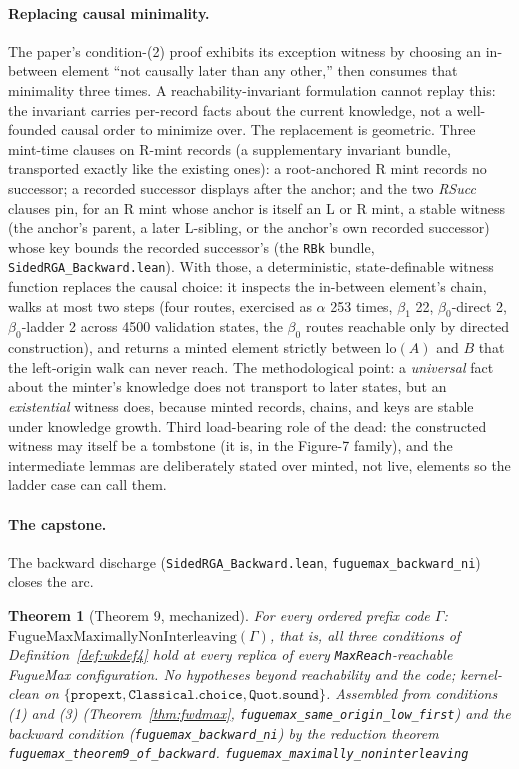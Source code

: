 \documentclass[11pt]{article}
\newtheorem{theorem}{Theorem}[section]
\newcommand{\lean}[1]{\texttt{#1}}
\newcommand{\code}[1]{\texttt{#1}}
\begin{document}
\paragraph{Replacing causal minimality.} The paper's condition-(2)
proof exhibits its exception witness by choosing an in-between element
``not causally later than any other,'' then consumes that minimality
three times. A reachability-invariant formulation cannot replay this:
the invariant carries per-record facts about the current knowledge, not
a well-founded causal order to minimize over. The replacement is
geometric. Three mint-time clauses on R-mint records (a supplementary
invariant bundle, transported exactly like the existing ones): a
root-anchored R mint records no successor; a recorded successor
displays after the anchor; and the two \emph{RSucc} clauses pin, for an
R mint whose anchor is itself an L or R mint, a stable witness (the
anchor's parent, a later L-sibling, or the anchor's own recorded
successor) whose key bounds the recorded successor's (the \lean{RBk}
bundle, \code{SidedRGA\_Backward.lean}). With those, a
deterministic, state-definable witness function replaces the causal
choice: it inspects the in-between element's chain, walks at most two
steps (four routes, exercised as $\alpha$ 253 times, $\beta_1$ 22,
$\beta_0$-direct 2, $\beta_0$-ladder 2 across 4500 validation states,
the $\beta_0$ routes reachable only by directed construction), and
returns a minted element strictly between $\mathrm{lo}(A)$ and $B$ that
the left-origin walk can never reach. The methodological point: a
\emph{universal} fact about the minter's knowledge does not transport
to later states, but an \emph{existential} witness does, because minted
records, chains, and keys are stable under knowledge growth. Third
load-bearing role of the dead: the constructed witness may itself be a
tombstone (it is, in the Figure-7 family), and the intermediate lemmas
are deliberately stated over minted, not live, elements so the ladder
case can call them.

\paragraph{The capstone.} The backward discharge
(\code{SidedRGA\_Backward.lean}, \lean{fuguemax\_backward\_ni})
closes the arc.

\begin{theorem}[Theorem 9, mechanized]
\label{thm:t9}
For every ordered prefix code $\Gamma$:
$\mathrm{FugueMaxMaximallyNonInterleaving}(\Gamma)$, that is, all
three conditions of Definition~\ref{def:wkdef4} hold at every
replica of every \lean{MaxReach}-reachable FugueMax configuration.
No hypotheses beyond reachability and the code; kernel-clean on
$\{\lean{propext}, \lean{Classical.choice}, \lean{Quot.sound}\}$.
Assembled from conditions (1) and (3)
(Theorem~\ref{thm:fwdmax}, \lean{fuguemax\_same\_origin\_low\_first})
and the backward condition (\lean{fuguemax\_backward\_ni}) by the
reduction theorem \lean{fuguemax\_theorem9\_of\_backward}.
\hfill\lean{fuguemax\_maximally\_noninterleaving}
\end{theorem}
\end{document}
